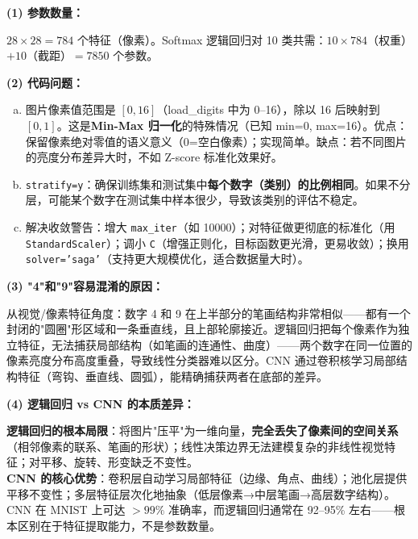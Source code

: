 \documentclass[a4paper,11pt]{ctexart}
\begin{document}
\begin{solutionbox}[参考答案与详细解析]
    \textbf{(1) 参数数量：}

    $28\times28=784$ 个特征（像素）。Softmax 逻辑回归对 10 类共需：$10\times784$（权重）$+10$（截距）$= 7850$ 个参数。

    \textbf{(2) 代码问题：}
    \begin{enumerate}[a.]
        \item 图片像素值范围是 $[0,16]$（load\_digits 中为 0--16），除以 16 后映射到 $[0,1]$。这是\textbf{Min-Max 归一化}的特殊情况（已知 min=0, max=16）。优点：保留像素绝对零值的语义意义（0=空白像素）；实现简单。缺点：若不同图片的亮度分布差异大时，不如 Z-score 标准化效果好。
        \item \texttt{stratify=y}：确保训练集和测试集中\textbf{每个数字（类别）的比例相同}。如果不分层，可能某个数字在测试集中样本很少，导致该类别的评估不稳定。
        \item 解决收敛警告：增大 \texttt{max\_iter}（如 10000）；对特征做更彻底的标准化（用 \texttt{StandardScaler}）；调小 \texttt{C}（增强正则化，目标函数更光滑，更易收敛）；换用 \texttt{solver='saga'}（支持更大规模优化，适合数据量大时）。
    \end{enumerate}

    \textbf{(3) "4"和"9"容易混淆的原因：}

    从视觉/像素特征角度：数字 4 和 9 在上半部分的笔画结构非常相似——都有一个封闭的"圆圈"形区域和一条垂直线，且上部轮廓接近。逻辑回归把每个像素作为独立特征，无法捕获局部结构（如笔画的连通性、曲度）——两个数字在同一位置的像素亮度分布高度重叠，导致线性分类器难以区分。CNN 通过卷积核学习局部结构特征（弯钩、垂直线、圆弧），能精确捕获两者在底部的差异。

    \textbf{(4) 逻辑回归 vs CNN 的本质差异：}

    \begin{keybox}
        \textbf{逻辑回归的根本局限}：将图片"压平"为一维向量，\textbf{完全丢失了像素间的空间关系}（相邻像素的联系、笔画的形状）；线性决策边界无法建模复杂的非线性视觉特征；对平移、旋转、形变缺乏不变性。\\
        \textbf{CNN 的核心优势}：卷积层自动学习局部特征（边缘、角点、曲线）；池化层提供平移不变性；多层特征层次化地抽象（低层像素→中层笔画→高层数字结构）。CNN 在 MNIST 上可达 $>99\%$ 准确率，而逻辑回归通常在 92--95\% 左右——根本区别在于特征提取能力，不是参数数量。
    \end{keybox}
\end{solutionbox}
\end{document}
